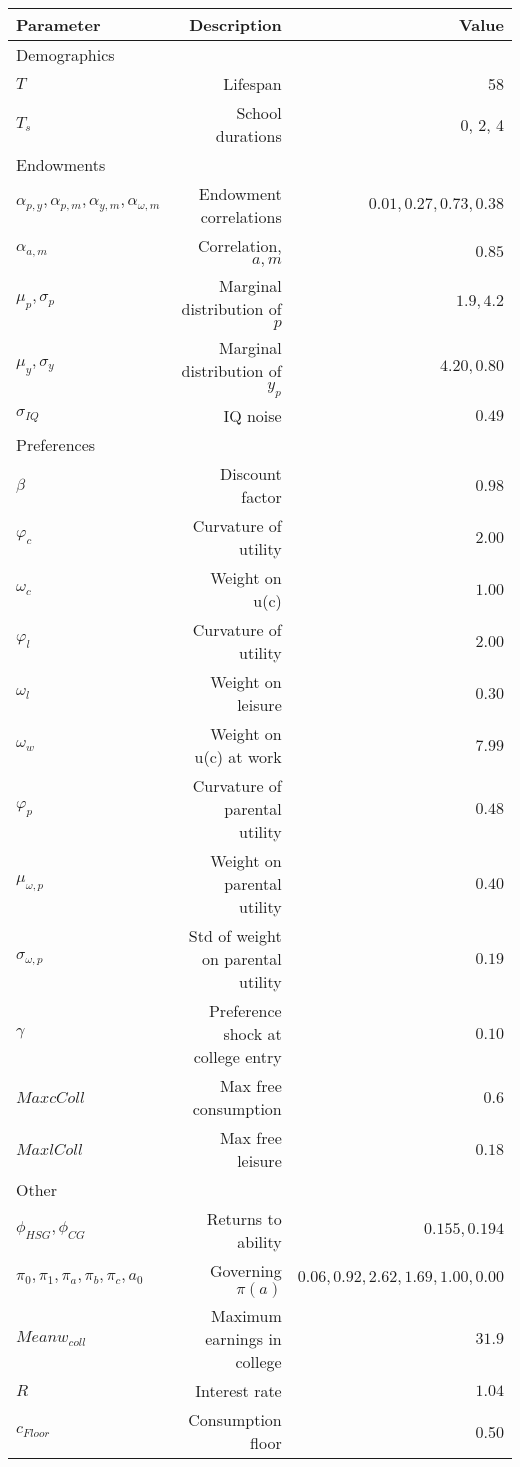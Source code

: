 \begin{tabular}{lrr}
\hline
Parameter & Description  & Value  \\
\hline
Demographics &   &   \\
$T$ & Lifespan  & 58  \\
$T_{s}$ & School durations  & 0, 2, 4  \\
Endowments &   &   \\
$\alpha_{p,y}, \alpha_{p,m}, \alpha_{y,m}, \alpha_{\omega,m}$ & Endowment correlations  & $0.01, 0.27, 0.73, 0.38$  \\
$\alpha_{a,m}$ & Correlation, $a,m$  & $0.85$  \\
$\mu_{p}, \sigma_{p}$ & Marginal distribution of $p$  & $1.9, 4.2$  \\
$\mu_{y}, \sigma_{y}$ & Marginal distribution of $y_{p}$  & $4.20, 0.80$  \\
$\sigma_{IQ}$ & IQ noise  & $0.49$  \\
Preferences &   &   \\
$\beta$ & Discount factor  & $0.98$  \\
$\varphi_{c}$ & Curvature of utility  & $2.00$  \\
$\omega_{c}$ & Weight on u(c)  & $1.00$  \\
$\varphi_{l}$ & Curvature of utility  & $2.00$  \\
$\omega_{l}$ & Weight on leisure  & $0.30$  \\
$\omega_{w}$ & Weight on u(c) at work  & $7.99$  \\
$\varphi_{p}$ & Curvature of parental utility  & $0.48$  \\
$\mu_{\omega,p}$ & Weight on parental utility  & $0.40$  \\
$\sigma_{\omega,p}$ & Std of weight on parental utility  & $0.19$  \\
$\gamma$ & Preference shock at college entry  & $0.10$  \\
$Max cColl$ & Max free consumption  & $0.6$  \\
$Max lColl$ & Max free leisure  & $0.18$  \\
Other &   &   \\
$\phi_{HSG}, \phi_{CG}$ & Returns to ability  & $0.155, 0.194$  \\
$\pi_{0}, \pi_{1}, \pi_{a}, \pi_{b}, \pi_{c}, a_{0}$ & Governing $\pi(a)$  & $0.06, 0.92, 2.62, 1.69, 1.00, 0.00$  \\
$Mean w_{coll}$ & Maximum earnings in college  & $31.9$  \\
$R$ & Interest rate  & $1.04$  \\
$c_{Floor}$ & Consumption floor  & 0.50  \\
\hline
\end{tabular}%
